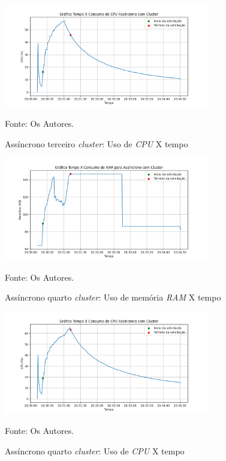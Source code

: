\documentclass[12pt]{article}
\begin{document}
\begin{figure}[!h]
\centering
\caption{Assíncrono terceiro \textit{cluster}: Uso de \textit{CPU} X tempo}
\includegraphics[width=0.8\textwidth]{images/pt-br/results/async-cluster_cpu_usage_2.png}
\label{fig:async-cluster_cpu_usage_2}

Fonte: Os Autores.
\end{figure}


\begin{figure}[!h]
\centering
\caption{Assíncrono quarto \textit{cluster}: Uso de memória \textit{RAM} X tempo}
\includegraphics[width=0.8\textwidth]{images/pt-br/results/async-cluster_memory_usage_3.png}
\label{fig:async-cluster_memory_usage_3}

Fonte: Os Autores.
\end{figure}

\begin{figure}[!h]
\centering
\caption{Assíncrono quarto \textit{cluster}: Uso de \textit{CPU} X tempo}
\includegraphics[width=0.8\textwidth]{images/pt-br/results/async-cluster_cpu_usage_3.png}
\label{fig:async-cluster_cpu_usage_3}

Fonte: Os Autores.
\end{figure}
\end{document}
